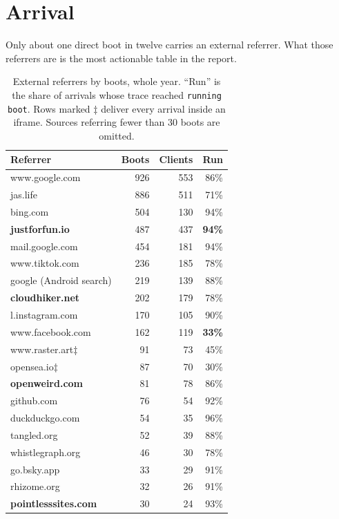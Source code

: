 \documentclass[10pt,letterpaper,twocolumn]{article}
\begin{document}
\section{Arrival}
\label{sec:arrival}

Only about one direct boot in twelve carries an external referrer. What
those referrers are is the most actionable table in the report.

\begin{table}[t]
\centering
\footnotesize
\caption{External referrers by boots, whole year. ``Run'' is the share of arrivals whose trace reached \texttt{running boot}. Rows marked $\ddagger$ deliver every arrival inside an iframe. Sources referring fewer than 30 boots are omitted.}
\label{tab:ref}
\begin{tabularx}{\columnwidth}{@{}X r r r@{}}
\toprule
\textbf{Referrer} & \textbf{Boots} & \textbf{Clients} & \textbf{Run} \\
\midrule
www.google.com          & 926 & 553 & 86\% \\
jas.life                & 886 & 511 & 71\% \\
bing.com                & 504 & 130 & 94\% \\
\textbf{justforfun.io}  & 487 & 437 & \textbf{94\%} \\
mail.google.com         & 454 & 181 & 94\% \\
www.tiktok.com          & 236 & 185 & 78\% \\
google (Android search) & 219 & 139 & 88\% \\
\textbf{cloudhiker.net} & 202 & 179 & 78\% \\
l.instagram.com         & 170 & 105 & 90\% \\
www.facebook.com        & 162 & 119 & \textbf{33\%} \\
www.raster.art$\ddagger$ &  91 &  73 & 45\% \\
opensea.io$\ddagger$    &  87 &  70 & 30\% \\
\textbf{openweird.com}  &  81 &  78 & 86\% \\
github.com              &  76 &  54 & 92\% \\
duckduckgo.com          &  54 &  35 & 96\% \\
tangled.org             &  52 &  39 & 88\% \\
whistlegraph.org        &  46 &  30 & 78\% \\
go.bsky.app             &  33 &  29 & 91\% \\
rhizome.org             &  32 &  26 & 91\% \\
\textbf{pointlesssites.com} & 30 & 24 & 93\% \\
\bottomrule
\end{tabularx}
\end{table}
\end{document}
